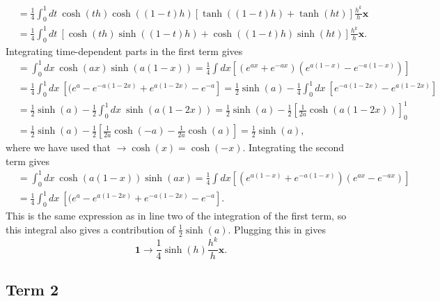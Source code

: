 \begin{align*}
    &=\frac{1}{4}\int_{0}^1 dt\: \cosh(th)\cosh((1-t)h) \left[ \tanh((1-t)h) + \tanh(ht)\right] \frac{h^k}{h} \mathbf{x}\\
    &=\frac{1}{4}\int_{0}^1 dt\:  \left[\cosh(th)\sinh((1-t)h) + \cosh((1-t)h)\sinh(ht) \right]\frac{h^k}{h} \mathbf{x}.
\end{align*}
Integrating time-dependent parts in the first term gives
\begin{align*}
    &= \int_{0}^1 dx\:\cosh(ax)\sinh(a(1-x))= \frac{1}{4} \int dx\left[ (e^{ax} + e^{-ax}) (e^{a(1-x)} - e^{-a(1-x)})\right]\\
    &= \frac{1}{4}\int_{0}^1 dx\:\left[ (e^{a} - e^{-a(1-2x)} + e^{a(1-2x)} - e^{-a}\right] = \frac{1}{2} \sinh(a) -\frac{1}{4}\int_{0}^1 dx\:\left[e^{-a(1-2x)} - e^{a(1-2x)}\right]\\
    &= \frac{1}{2} \sinh(a) - \frac{1}{2}\int_{0}^1 dx\:\sinh(a(1-2x)) = \frac{1}{2} \sinh(a) - \frac{1}{2} \left[\frac{1}{2a}\cosh(a(1-2x))\right]_0^1\\
    & = \frac{1}{2} \sinh(a) - \frac{1}{2} \left[\frac{1}{2a}\cosh(-a) - \frac{1}{2a}\cosh(a)\right] = \frac{1}{2} \sinh(a),
\end{align*}
where we have used that $\rightarrow \cosh(x)=\cosh(-x)$. Integrating the second term gives
\begin{align*}
    &=\int_{0}^1 dx\:\cosh(a(1-x))\sinh(ax) = \frac{1}{4} \int dx\left[ (e^{a(1-x)} + e^{-a(1-x)})(e^{ax} - e^{-ax}) \right]\\
    &= \frac{1}{4}\int_{0}^1 dx\:\left[ (e^{a} - e^{a(1-2x)} + e^{-a(1-2x)} - e^{-a}\right].
\end{align*}
This is the same expression as in line two of the integration of the first term, so this integral also gives a contribution of $\frac{1}{2}\sinh(a)$. Plugging this in gives
\begin{equation}
    \textbf{1}\rightarrow \frac{1}{4}\sinh(h)\frac{h^k}{h} \mathbf{x}
    \label{eq:term_1}.
\end{equation}

\subsection*{Term 2}

